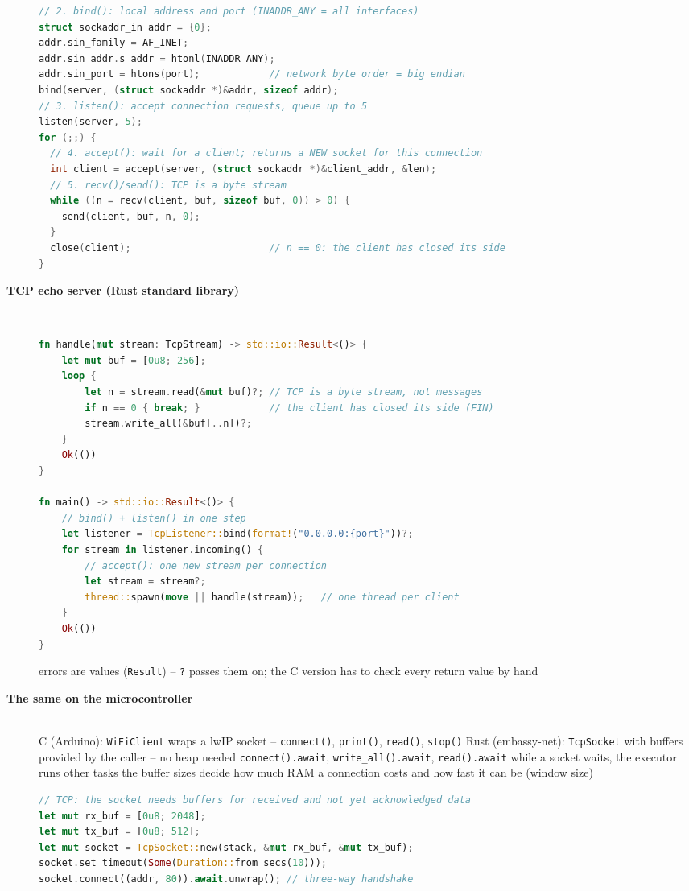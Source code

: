 \begin{description}
\begin{lstlisting}[language=C]
// 2. bind(): local address and port (INADDR_ANY = all interfaces)
struct sockaddr_in addr = {0};
addr.sin_family = AF_INET;
addr.sin_addr.s_addr = htonl(INADDR_ANY);
addr.sin_port = htons(port);            // network byte order = big endian
bind(server, (struct sockaddr *)&addr, sizeof addr);
// 3. listen(): accept connection requests, queue up to 5
listen(server, 5);
for (;;) {
  // 4. accept(): wait for a client; returns a NEW socket for this connection
  int client = accept(server, (struct sockaddr *)&client_addr, &len);
  // 5. recv()/send(): TCP is a byte stream
  while ((n = recv(client, buf, sizeof buf, 0)) > 0) {
    send(client, buf, n, 0);
  }
  close(client);                        // n == 0: the client has closed its side
}
\end{lstlisting}
\os{\newpage}

\item[{\rot\bf TCP echo server (Rust standard library)}]~\\[-\lstskip]
\begin{lstlisting}[language=Rust]
fn handle(mut stream: TcpStream) -> std::io::Result<()> {
    let mut buf = [0u8; 256];
    loop {
        let n = stream.read(&mut buf)?; // TCP is a byte stream, not messages
        if n == 0 { break; }            // the client has closed its side (FIN)
        stream.write_all(&buf[..n])?;
    }
    Ok(())
}

fn main() -> std::io::Result<()> {
    // bind() + listen() in one step
    let listener = TcpListener::bind(format!("0.0.0.0:{port}"))?;
    for stream in listener.incoming() {
        // accept(): one new stream per connection
        let stream = stream?;
        thread::spawn(move || handle(stream));   // one thread per client
    }
    Ok(())
}
\end{lstlisting}
\bi
	\ite errors are values (\texttt{Result}) -- \texttt{?} passes them on; the C version has to check every return value by hand
\ei
\os{\newpage}

\item[{\rot\bf The same on the microcontroller}]~\\[-\lblskip]
\bi
	\ite C (Arduino): \texttt{WiFiClient} wraps a lwIP socket -- \texttt{connect()}, \texttt{print()}, \texttt{read()}, \texttt{stop()}
	\ite Rust (embassy-net): \texttt{TcpSocket} with buffers provided by the caller -- no heap needed
	\bi
		\ite \texttt{connect().await}, \texttt{write\_all().await}, \texttt{read().await}
		\ite while a socket waits, the executor runs other tasks
	\ei
	\ite the buffer sizes decide how much RAM a connection costs and how fast it can be (window size)
\ei
\begin{lstlisting}[language=Rust]
// TCP: the socket needs buffers for received and not yet acknowledged data
let mut rx_buf = [0u8; 2048];
let mut tx_buf = [0u8; 512];
let mut socket = TcpSocket::new(stack, &mut rx_buf, &mut tx_buf);
socket.set_timeout(Some(Duration::from_secs(10)));
socket.connect((addr, 80)).await.unwrap(); // three-way handshake
\end{lstlisting}
\os{\newpage}
\end{description}

